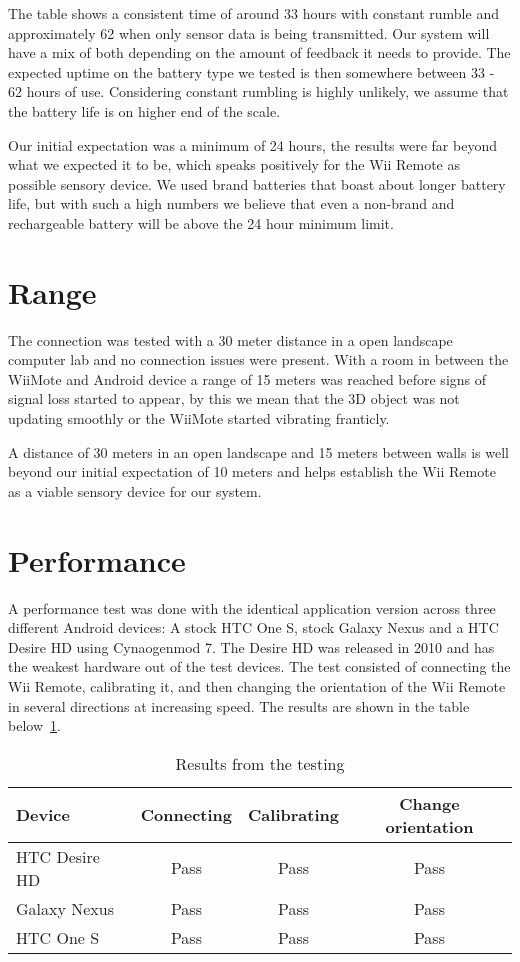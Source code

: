 The table shows a consistent time of around 33 hours with constant rumble and approximately 62 when only sensor data is being transmitted. Our system will have a mix of both depending on the amount of feedback it needs to provide. The expected uptime on the battery type we tested is then somewhere between 33 - 62 hours of use. Considering constant rumbling is highly unlikely, we assume that the battery life is on higher end of the scale.

Our initial expectation was a minimum of 24 hours, the results were far beyond what we expected it to be, which speaks positively for the Wii Remote as possible sensory device. We used brand batteries that boast about longer battery life, but with such a high numbers we believe that even a non-brand and rechargeable battery will be above the 24 hour minimum limit.
\section{Range}
The connection was tested with a 30 meter distance in a open landscape computer lab and no connection issues were present. With a room in between the WiiMote and Android device a range of 15 meters was reached before signs of signal loss started to appear, by this we mean that the 3D object was not updating smoothly or the WiiMote started vibrating franticly.

A distance of 30 meters in an open landscape and 15 meters between walls is well beyond our initial expectation of 10 meters and helps establish the Wii Remote as a viable sensory device for our system.
\section{Performance}
A performance test was done with the identical application version across three different Android devices: A stock HTC One S, stock Galaxy Nexus and a HTC Desire HD using Cynaogenmod 7. The Desire HD was released in 2010 and has the weakest hardware out of the test devices. The test consisted of connecting the Wii Remote, calibrating it, and then changing the orientation of the Wii Remote in several directions at increasing speed. The results are shown in the table below~\ref{tab:testResults}.

\begin{table}[h!]
\centering
\begin{tabularx}{\textwidth}{|X||c|c|c|}
\hline
\textbf{Device} & \textbf{Connecting} & \textbf{Calibrating} & \textbf{Change orientation} \\ \hline
HTC Desire HD & Pass & Pass & Pass \\ \hline
Galaxy Nexus & Pass & Pass & Pass \\ \hline
HTC One S & Pass & Pass & Pass \\ \hline

\end{tabularx}
\caption{\footnotesize Results from the testing}
\label{tab:testResults}
\end{table}

